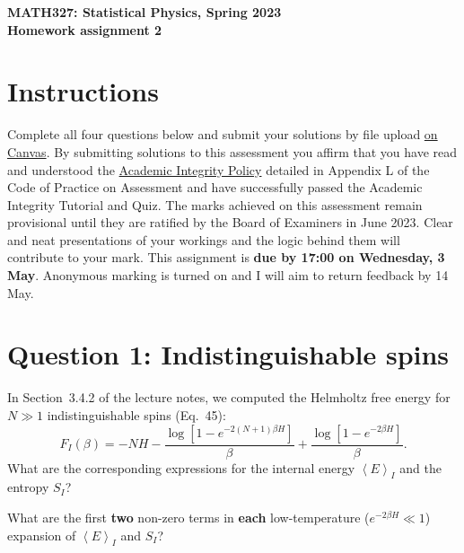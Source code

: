 \documentclass[12 pt]{article} %
\newcommand{\be}{\ensuremath{\beta} }
\newcommand{\vev}[1]{\ensuremath{\left\langle #1 \right\rangle} }
\newcommand{\showmarks}[1]{\rightline{\texttt{[#1 marks]}}} %
\begin{document}
\newcommand{\thisweek}{MATH327 Homework 2}
\newcommand{\moddate}{Last modified 13 Apr.~2023}
\begin{center}
  {\Large \textbf{MATH327: Statistical Physics, Spring 2023}} \\[12 pt]
  {\Large \textbf{Homework assignment 2}} \\[24 pt]
\end{center}

\section*{Instructions}
Complete all four questions below and submit your solutions by file upload \href{https://liverpool.instructure.com/courses/60601/assignments/226601}{on Canvas}.
By submitting solutions to this assessment you affirm that you have read and understood the \href{https://www.liverpool.ac.uk/media/livacuk/tqsd/code-of-practice-on-assessment/appendix_L_cop_assess.pdf}{Academic Integrity Policy} detailed in Appendix L of the Code of Practice on Assessment and have successfully passed the Academic Integrity Tutorial and Quiz.
The marks achieved on this assessment remain provisional until they are ratified by the Board of Examiners in June 2023.
Clear and neat presentations of your workings and the logic behind them will contribute to your mark.
This assignment is \textbf{due by 17:00 on Wednesday, 3 May}.
Anonymous marking is turned on and I will aim to return feedback by 14 May. %



\vfill
\section*{Question 1: Indistinguishable spins}
In Section~3.4.2 of the lecture notes, we computed the Helmholtz free energy for $N \gg 1$ indistinguishable spins (Eq.~45):
\begin{equation*}
  F_I(\be) = -NH - \frac{\log\left[1 - e^{-2(N + 1) \be H}\right]}{\be} + \frac{\log\left[1 - e^{-2 \be H}\right]}{\be}.
\end{equation*}
What are the corresponding expressions for the internal energy $\vev{E}_I$ and the entropy $S_I$?

\showmarks{6}

What are the first \textbf{two} non-zero terms in \textbf{each} low-temperature ($e^{-2\be H} \ll 1$) expansion of $\vev{E}_I$ and $S_I$?
\end{document}
